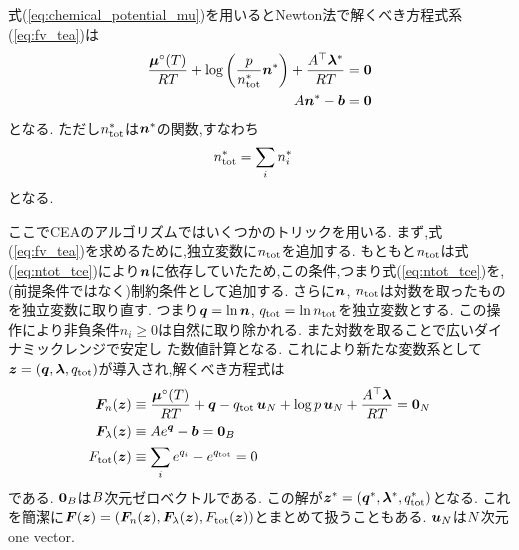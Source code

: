 式(\ref{eq:chemical_potential_mu})を用いるとNewton法で解くべき方程式系(\ref{eq:fv_tea})は
\begin{align}
\label{eq:Lpartialnx}
    \frac{\boldsymbol{\mu}^\circ(T)}{RT}+ \log{\left(\frac{p}{n_\mathrm{tot}^\ast} \boldsymbol{n}^\ast \right)} + \frac{A^\top \boldsymbol{\lambda}^\ast}{RT}   &= \boldsymbol{0} \\
    A \boldsymbol{n}^\ast - \boldsymbol{b} &= \boldsymbol{0}
\end{align}
となる. ただし$n_\mathrm{tot}^\ast$は$\boldsymbol{n}^\ast$の関数,すなわち
\begin{align}
n_\mathrm{tot}^\ast &= \sum_i n_i^\ast
\end{align}
となる. 


ここでCEAのアルゴリズムではいくつかのトリックを用いる. まず,式(\ref{eq:fv_tea})を求めるために,独立変数に$n_\mathrm{tot}$を追加する. もともと$n_\mathrm{tot}$は式(\ref{eq:ntot_tce})により$\boldsymbol{n}$に依存していたため,この条件,つまり式(\ref{eq:ntot_tce})を,(前提条件ではなく)制約条件として追加する. さらに$\boldsymbol{n}$, $n_\mathrm{tot}$は対数を取ったものを独立変数に取り直す. つまり$\boldsymbol{q} = \ln{\boldsymbol{n}}$, $q_\mathrm{tot} = \ln{n_\mathrm{tot}}$を独立変数とする.  この操作により非負条件$n_i \ge 0$は自然に取り除かれる. また対数を取ることで広いダイナミックレンジで安定し
た数値計算となる. これにより新たな変数系として$\boldsymbol{z} = (\boldsymbol{q}, \boldsymbol{\lambda}, q_\mathrm{tot})$が導入され,解くべき方程式は
\begin{align}
\label{eq:Lpartialncea}
    \boldsymbol{F}_n (\boldsymbol{z}) &\equiv \frac{\boldsymbol{\mu}^\circ(T)}{RT} + \boldsymbol{q} - q_\mathrm{tot} \, \boldsymbol{u}_N + \log{p} \, \boldsymbol{u}_N  + \frac{A^\top \boldsymbol{\lambda}}{RT} = \boldsymbol{0}_N \\
    \boldsymbol{F}_\lambda (\boldsymbol{z}) &\equiv A e^{\boldsymbol{q}} - \boldsymbol{b} = \boldsymbol{0}_B \\
    F_\mathrm{tot} (\boldsymbol{z}) &\equiv \sum_i {e^{q_i}} - e^{q_\mathrm{tot}} = 0
\end{align}
である. $\boldsymbol{0}_B$は$B$次元ゼロベクトルである. この解が$\boldsymbol{z}^\ast = (\boldsymbol{q}^\ast, \boldsymbol{\lambda}^\ast, q_\mathrm{tot}^\ast)$となる. これを簡潔に$\boldsymbol{F} (\boldsymbol{z}) = (\boldsymbol{F}_n (\boldsymbol{z}), \boldsymbol{F}_\lambda (\boldsymbol{z}), F_\mathrm{tot} (\boldsymbol{z}))$とまとめて扱うこともある.  $\boldsymbol{u}_N$は$N$次元 one vector.

